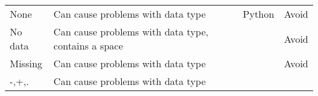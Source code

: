 \begin{longtable}[c]{@{}llll@{}}
\\\addlinespace
\begin{minipage}[t]{0.10\columnwidth}\raggedright
None
\end{minipage} & \begin{minipage}[t]{0.23\columnwidth}\raggedright
Can cause problems with data type
\end{minipage} & \begin{minipage}[t]{0.17\columnwidth}\raggedright
Python
\end{minipage} & \begin{minipage}[t]{0.18\columnwidth}\raggedright
Avoid
\end{minipage}
\\\addlinespace
\begin{minipage}[t]{0.10\columnwidth}\raggedright
No data
\end{minipage} & \begin{minipage}[t]{0.23\columnwidth}\raggedright
Can cause problems with data type, contains a space
\end{minipage} & \begin{minipage}[t]{0.17\columnwidth}\raggedright
\end{minipage} & \begin{minipage}[t]{0.18\columnwidth}\raggedright
Avoid
\end{minipage}
\\\addlinespace
\begin{minipage}[t]{0.10\columnwidth}\raggedright
Missing
\end{minipage} & \begin{minipage}[t]{0.23\columnwidth}\raggedright
Can cause problems with data type
\end{minipage} & \begin{minipage}[t]{0.17\columnwidth}\raggedright
\end{minipage} & \begin{minipage}[t]{0.18\columnwidth}\raggedright
Avoid
\end{minipage}
\\\addlinespace
\begin{minipage}[t]{0.10\columnwidth}\raggedright
-,+,.
\end{minipage} & \begin{minipage}[t]{0.23\columnwidth}\raggedright
Can cause problems with data type
\end{minipage} & \begin{minipage}[t]{0.17\columnwidth}\raggedright
\end{minipage} & \begin{minipage}[t]{0.18\columnwidth}\raggedright

\end{minipage}
\end{longtable}
